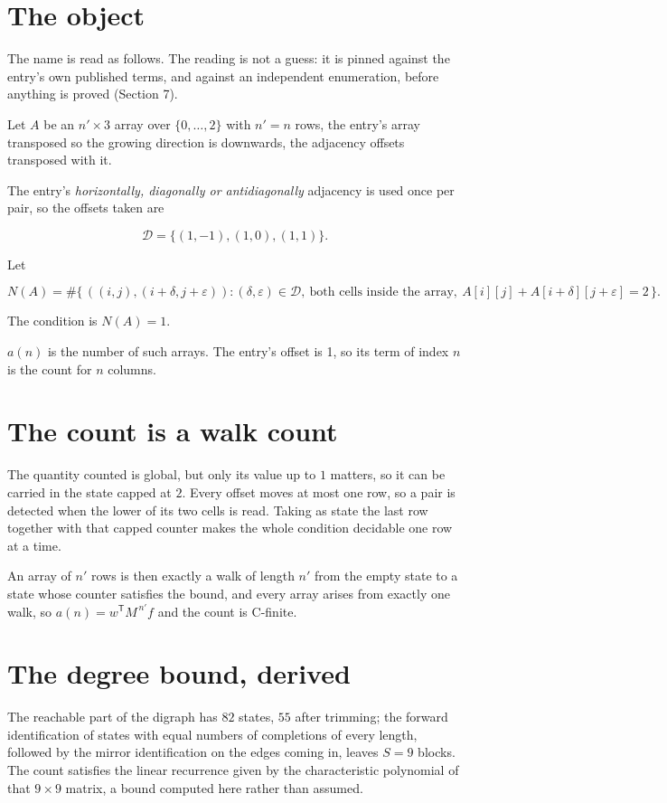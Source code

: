 \documentclass[11pt]{article}
\theoremstyle{definition}
\begin{document}
\section{The object}

The name is read as follows. The reading is not a guess: it is pinned against the entry's own published terms, and against an independent enumeration, before anything is proved (Section 7).

Let $A$ be an $n' \times 3$ array over $\{0,\dots,2\}$ with $n' = n$ rows, the entry's array transposed so the growing direction is downwards, the adjacency offsets transposed with it.

The entry's {\itshape horizontally, diagonally or antidiagonally} adjacency is used once per pair, so the offsets taken are

\[\mathcal{D} = \{(1,-1), (1,0), (1,1)\}.\]

Let

\[N(A) = \#\bigl\{\,((i,j),(i{+}\delta,j{+}\varepsilon)) : (\delta,\varepsilon) \in \mathcal{D},\ \text{both cells inside the array},\ A[i][j] + A[i{+}\delta][j{+}\varepsilon] = 2\,\bigr\}.\]

The condition is $N(A) = 1$.

$a(n)$ is the number of such arrays. The entry's offset is 1, so its term of index $n$ is the count for $n$ columns.

\section{The count is a walk count}

The quantity counted is global, but only its value up to $1$ matters, so it can be carried in the state capped at $2$. Every offset moves at most one row, so a pair is detected when the lower of its two cells is read. Taking as state the last row together with that capped counter makes the whole condition decidable one row at a time.

An array of $n'$ rows is then exactly a walk of length $n'$ from the empty state to a state whose counter satisfies the bound, and every array arises from exactly one walk, so $a(n) = w^{\mathsf T}M^{\,n'}f$ and the count is C-finite.

\section{The degree bound, derived}

The reachable part of the digraph has $82$ states, $55$ after trimming; the forward identification of states with equal numbers of completions of every length, followed by the mirror identification on the edges coming in, leaves $S = 9$ blocks. The count satisfies the linear recurrence given by the characteristic polynomial of that $9\times9$ matrix, a bound computed here rather than assumed.
\end{document}
